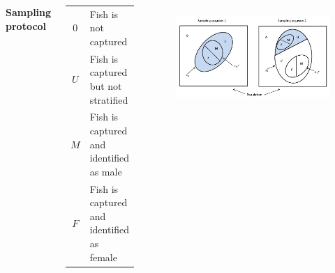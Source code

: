 \documentclass{beamer}
\begin{document}
\begin{frame}
\begin{columns}
{\tiny 
\textbf{Sampling protocol}
\begin{center}
\begin{tabular}{c l}
$0$ &Fish  is not captured \\
$U$ &Fish is captured but not stratified\\
$M$ &Fish is captured and identified as male\\
$F$ &Fish is captured and identified as female\\
\end{tabular}
\end{center}
}
\begin{figure}[h]
    \centering
    \includegraphics[scale=0.24]{CaptureRecaptureFig1.png}
    \label{fig:PSTSCRE}
\end{figure}


\end{columns}

\end{frame}


\end{document}
